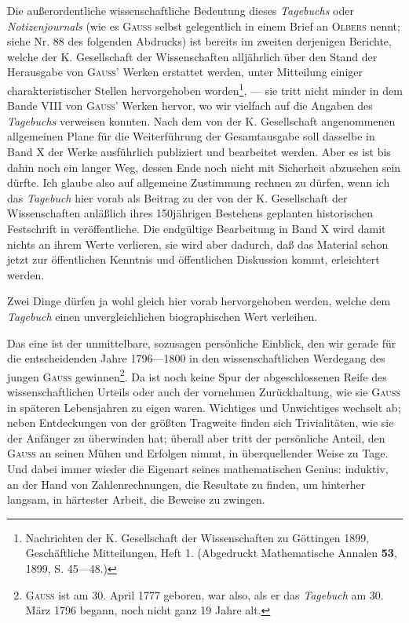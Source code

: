 \indent Die außerordentliche wissenschaftliche Bedeutung dieses \textit{Tagebuchs} oder \textit{Notizenjournals} (wie es \textsc{Gauss} selbst gelegentlich in einem Brief an \textsc{Olbers} nennt; siehe Nr. 88 des folgenden Abdrucks) ist bereits im zweiten derjenigen Berichte, welche der K. Gesellschaft der Wissenschaften alljährlich über den Stand der Herausgabe von \textsc{Gauss}' Werken erstattet werden, unter Mitteilung einiger charakteristischer Stellen hervorgehoben worden\begingroup\renewcommand{\thefootnote}{**)}\footnote{Nachrichten der K. Gesellschaft der Wissenschaften zu Göttingen 1899, Geschäftliche Mitteilungen, Heft 1. (Abgedruckt Mathematische Annalen \textbf{53}, 1899, S. 45—48.)}\endgroup, — sie tritt nicht minder in dem Bande VIII von \textsc{Gauss}' Werken hervor, wo wir vielfach auf die Angaben des \textit{Tagebuchs} verweisen konnten. Nach dem von der K. Gesellschaft angenommenen allgemeinen Plane für die Weiterführung der Gesamtausgabe soll dasselbe in Band X der Werke ausführlich publiziert und bearbeitet werden. Aber es ist bis dahin noch ein langer Weg, dessen Ende noch nicht mit Sicherheit abzusehen sein dürfte. Ich glaube also auf allgemeine Zustimmung rechnen zu dürfen, wenn ich das \textit{Tagebuch} hier vorab als Beitrag zu der von der K. Gesellschaft der Wissenschaften anläßlich ihres 150jährigen Bestehens geplanten historischen Festschrift in  veröffentliche. Die endgültige Bearbeitung in Band X wird damit nichts an ihrem Werte verlieren, sie wird aber dadurch, daß das Material schon jetzt zur öffentlichen Kenntnis und öffentlichen Diskussion kommt, erleichtert werden.

\indent Zwei Dinge dürfen ja wohl gleich hier vorab hervorgehoben werden, welche dem \textit{Tagebuch} einen unvergleichlichen biographischen Wert verleihen.

\clearpage{}
\indent Das eine ist der unmittelbare, sozusagen persönliche Einblick, den wir gerade für die entscheidenden Jahre 1796—1800 in den wissenschaftlichen Werdegang des jungen \textsc{Gauss} gewinnen\footnote{\textsc{Gauss} ist am 30. April 1777 geboren, war also, als er das \textit{Tagebuch} am 30. März 1796 begann, noch nicht ganz 19 Jahre alt.}. Da ist noch keine Spur der abgeschlossenen Reife des wissenschaftlichen Urteils oder auch der vornehmen Zurückhaltung, wie sie \textsc{Gauss} in späteren Lebensjahren zu eigen waren. Wichtiges und Unwichtiges wechselt ab; neben Entdeckungen von der größten Tragweite finden sich Trivialitäten, wie sie der Anfänger zu überwinden hat; überall aber tritt der persönliche Anteil, den \textsc{Gauss} an seinen Mühen und Erfolgen nimmt, in überquellender Weise zu Tage. Und dabei immer wieder die Eigenart seines mathematischen Genius: induktiv, an der Hand von Zahlenrechnungen, die Resultate zu finden, um hinterher langsam, in härtester Arbeit, die Beweise zu zwingen.

